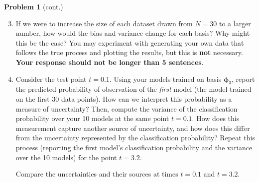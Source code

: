 \documentclass[submit]{harvardml}
\begin{document}
\newpage
\begin{framed}
\noindent\textbf{Problem 1} (cont.)\\
\begin{enumerate}
\setcounter{enumi}{2}

\item If we were to increase the size of each dataset drawn from $N = 30$ to a larger number, how would the bias and variance change for each basis? Why might this be the case? You may experiment with generating your own data that follows the true process and plotting the results, but this is \textbf{not} necessary. \textbf{Your response should not be longer than 5 sentences}.

\item Consider the test point $t = 0.1$. Using your models trained on basis $\boldsymbol\phi_3$, report the predicted probability of observation of the \textit{first} model (the model trained on the first 30 data points). How can we interpret this probability as a measure of uncertainty? Then, compute the variance of the classification probability over your 10 models at the same point $t = 0.1$. How does this measurement capture another source of uncertainty, and how does this differ from the uncertainty represented by the classification probability? Repeat this process (reporting the first model's classification probability and the variance over the 10 models) for the point $t = 3.2$.

  Compare the uncertainties and their sources at times $t=0.1$ and $t=3.2$.


\end{enumerate}
\end{framed}
\end{document}
